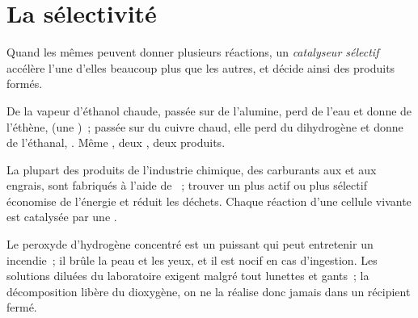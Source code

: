 \section{La sélectivité}

\begin{definition}\label{def:g12:catalysis:selective}
Quand les mêmes  peuvent donner plusieurs réactions, un
\emph{catalyseur sélectif} accélère l'une
d'elles beaucoup plus que les autres, et décide ainsi des produits
formés.
\end{definition}

\begin{example}\label{ex:g12:catalysis:ethanol}
De la vapeur d'éthanol chaude, passée sur de l'alumine, perd de l'eau et
donne de l'éthène,  (une )~; passée
sur du cuivre chaud, elle perd du dihydrogène et donne de l'éthanal,
. Même , deux , deux
produits.
\end{example}

\begin{remark}\label{rem:g12:catalysis:everywhere}
La plupart des produits de l'industrie chimique, des carburants aux
 et aux engrais, sont fabriqués à l'aide de
~; trouver un  plus actif ou plus sélectif
économise de l'énergie et réduit les déchets. Chaque réaction d'une
cellule vivante est catalysée par une .
\end{remark}

\begin{safety}{}
Le peroxyde d'hydrogène concentré est un  puissant qui peut
entretenir un incendie~; il brûle la peau et les yeux, et il est nocif
en cas d'ingestion. Les solutions diluées du laboratoire exigent malgré
tout lunettes et gants~; la décomposition libère du dioxygène, on ne la
réalise donc jamais dans un récipient fermé.
\end{safety}

